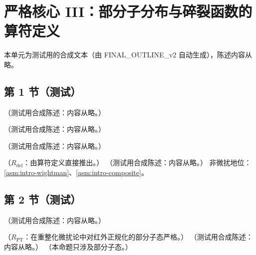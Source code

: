 \chapter{严格核心 III：部分子分布与碎裂函数的算符定义}\label{ch:pdf}
本单元为测试用的合成文本（由 FINAL\_OUTLINE\_v2 自动生成），陈述内容从略。

\section{第 1 节（测试）}\label{sec:pdf-definitions}

\begin{definition}[夸克分布]\label{def:pdf-quark}
（测试用合成陈述：内容从略。）
\end{definition}

\begin{definition}[反夸克分布]\label{def:pdf-antiquark}
（测试用合成陈述：内容从略。）
\end{definition}

\begin{definition}[胶子分布]\label{def:pdf-gluon}
（测试用合成陈述：内容从略。）
\end{definition}

\begin{proposition}\label{prop:pdf-invariance}
（$R_{\mathrm{def}}$：由算符定义直接推出。）
（测试用合成陈述：内容从略。）
非微扰地位：\cref{asm:intro-wightman}、\cref{asm:intro-composite}。
\end{proposition}

\section{第 2 节（测试）}\label{sec:pdf-properties}

\begin{example}[自由场值]\label{ex:pdf-free-field}
（测试用合成陈述：内容从略。）
\end{example}

\begin{theorem}\label{thm:pdf-support-pt}
（$R_{\mathrm{PT}}$：在重整化微扰论中对红外正规化的部分子态严格。）
（测试用合成陈述：内容从略。）
（本命题只涉及部分子态。）
\end{theorem}

